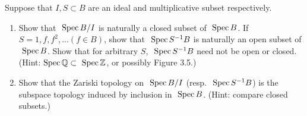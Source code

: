 \begin{exr}\label{chap3exr:specA_f_and_specA/I}
Suppose that $I, S \subset B$ are an ideal and multiplicative subset respectively.
\begin{enumerate}[label=(\alph*)]
\item Show that $\text{ Spec\,} B/I$ is naturally a closed subset of $\text{ Spec\,} B$. If $S = {1,f,f^2,...} (f \in B)$, show that $\text{ Spec\,} S^{-1}B$ is naturally an open subset of $\text{ Spec\,} B$. Show that for arbitrary $S$, $\text{ Spec\,} S^{-1}B$ need not be open or closed. (Hint:$ \text{ Spec\,} \mathbb Q \subset \text{ Spec\,} \mathbb Z$, or possibly Figure 3.5.)
\item  Show that the Zariski topology on $\text{ Spec\,} B/I$ (resp. $\text{ Spec\,} S^{-1}B$) is the subspace topology induced by inclusion in $\text{ Spec\,} B$. (Hint: compare closed subsets.)
\end{enumerate}
\end{exr}
